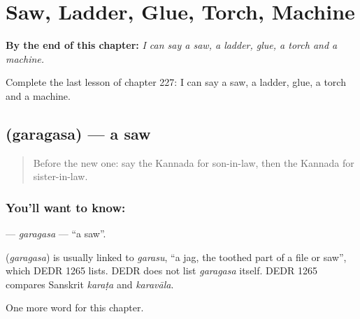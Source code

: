 
\chapter{Saw, Ladder, Glue, Torch, Machine}
\label{ch:ka-saw-ladder-glue-torch-machine}

\begin{chapteropening}
\textbf{By the end of this chapter:} \emph{I can say a saw, a ladder, glue, a torch and a machine.}

Complete the last lesson of chapter 227: I can say a saw, a ladder, glue, a torch and a machine.
\end{chapteropening}

\section[\texorpdfstring{\kn{ಗರಗಸ} (garagasa)}{ಗರಗಸ (garagasa)}]{ (garagasa) — a saw}

\label{lesson:KA-C227-garagasa}



\begin{quote}
Before the new one: say the Kannada for son-in-law, then the Kannada for sister-in-law.
\end{quote}

\subsection*{You'll want to know: }
\textbf{} — \emph{garagasa} — \textquotedblleft{}a saw\textquotedblright{}.

\begin{cousinweb}
\textbf{} (\emph{garagasa}) is usually linked to \emph{garasu}, \textquotedblleft{}a jag, the toothed part of a file or saw\textquotedblright{}, which DEDR 1265 lists. DEDR does not list \emph{garagasa} itself. DEDR 1265 compares Sanskrit \emph{karaṭa} and \emph{karavāla}.
\end{cousinweb}

\begin{grammarlens}[title={What you've built}]
One more word for this chapter.
\end{grammarlens}

